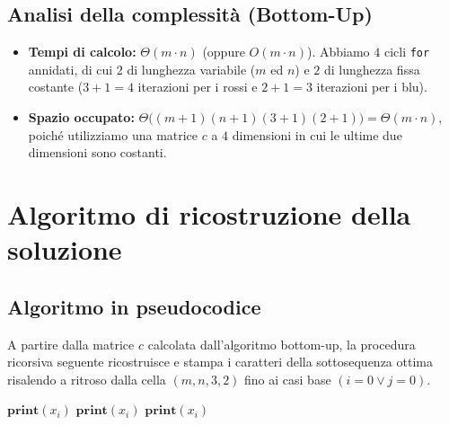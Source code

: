\subsection{Analisi della complessità (Bottom-Up)}
\begin{itemize}
    \item \textbf{Tempi di calcolo:} $\Theta(m \cdot n)$ (oppure $O(m \cdot n)$). Abbiamo $4$ cicli \texttt{for} annidati, di cui $2$ di lunghezza variabile ($m$ ed $n$) e $2$ di lunghezza fissa costante ($3+1 = 4$ iterazioni per i rossi e $2+1 = 3$ iterazioni per i blu).
    \item \textbf{Spazio occupato:} $\Theta\big((m+1)(n+1)(3+1)(2+1)\big) = \Theta(m \cdot n)$, poiché utilizziamo una matrice $c$ a $4$ dimensioni in cui le ultime due dimensioni sono costanti.
\end{itemize}

\newpage
\section{Algoritmo di ricostruzione della soluzione}
\subsection{Algoritmo in pseudocodice}

A partire dalla matrice $c$ calcolata dall'algoritmo bottom-up, la procedura ricorsiva seguente ricostruisce e stampa i caratteri della sottosequenza ottima risalendo a ritroso dalla cella $(m, n, 3, 2)$ fino ai casi base $(i = 0 \lor j = 0)$.

\begin{algorithm}[H]
\caption{Procedura ricorsiva di ricostruzione $\text{Print-LCS}_{3r,2b}(c, X, Y, i, j, r, b)$}
\begin{algorithmic}[1]
        \State \Return
    \EndIf
            \State {}
        \Else
            \State {}
        \EndIf
    \Else
                \State {}
                \State $\textbf{print}(x_i)$
            \Else
                \State {}
            \EndIf
                \State {}
                \State $\textbf{print}(x_i)$
            \Else
                \State {}
            \EndIf
        \Else \Comment{\textcolor{darkgreen}{Elemento nero}}
            \State {}
            \State $\textbf{print}(x_i)$
        \EndIf
    \EndIf
\EndProcedure
\end{algorithmic}
\end{algorithm}


